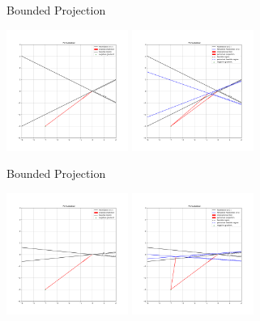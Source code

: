 \documentclass{beamer}
\begin{document}


\begin{frame}{Bounded Projection}
	\begin{center}
		\includegraphics[width=150px]{images/hoffman_0.png}
		\includegraphics[width=150px]{images/hoffman_1.png}
	\end{center}
\end{frame}


\begin{frame}{Bounded Projection}
	\begin{center}
		\includegraphics[width=150px]{images/hoffman_2.png}
		\includegraphics[width=150px]{images/hoffman_3.png}
	\end{center}
\end{frame}
\end{document}
